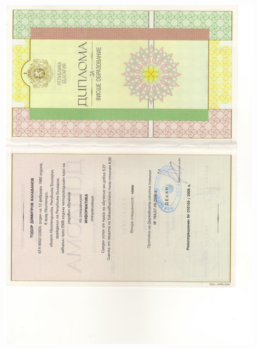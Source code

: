 \documentclass[bulgarian,a4paper]{europasscv}
\begin{document}
\includegraphics[width=\textwidth,height=\textheight,keepaspectratio]{DiplomaNBU2006_1}
\end{document}

